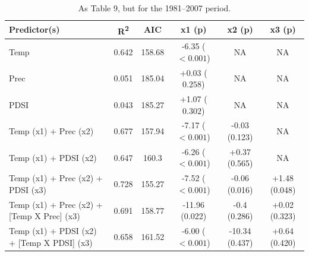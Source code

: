 \documentclass[12pt]{article}
\begin{document}
\begin{table}
\small
\caption{\small As Table 9, but for the 1981--2007 period.}
\centering
\begin{tabular}{l c c c c c}
\hline
Predictor(s) & R\textsuperscript{2} & AIC & x1 (p) & x2 (p) & x3 (p)\\
\hline
Temp & 0.642 & 158.68 & -6.35 ($<0.001$) & NA & NA\\
Prec	 & 0.051 & 185.04 & +0.03 ($0.258$) & NA & NA\\
PDSI & 0.043 & 185.27 & +1.07 ($0.302$) & NA & NA\\
\hline
Temp (x1) + Prec (x2)  & 0.677 & 157.94 & -7.17 ($<0.001$) & -0.03 (0.123) & NA\\
Temp (x1) + PDSI (x2) & 0.647 & 160.3 & -6.26 ($<0.001$) & +0.37 (0.565) & NA\\
Temp (x1) + Prec (x2) + PDSI (x3)	& 0.728 & 155.27 & -7.52 ($<0.001$) & -0.06 (0.016) & +1.48 (0.048)\\
Temp (x1) + Prec (x2) + [Temp X Prec] (x3)	& 0.691 & 158.77 & -11.96 (0.022) & -0.4 (0.286) & +0.02 (0.323)\\
Temp (x1) + PDSI (x2) + [Temp X PDSI] (x3) & 0.658 & 161.52 & -6.00 ($<0.001$) & -10.34 (0.437) & +0.64 (0.420)\\
\hline
\end{tabular}
\end{table}

\pagebreak

\renewcommand{\figurename}{Supplementary Figure}
\setcounter{figure}{0}
\end{document}
